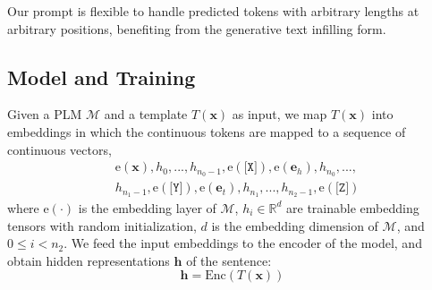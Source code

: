 \documentclass[11pt]{article}
\begin{document}
Our prompt is flexible to handle predicted tokens with arbitrary lengths at arbitrary positions, benefiting from the generative text infilling form.
\begin{comment}
For example, we convert the example given in Section~\ref{4.1} to :

\begin{small}
	\begin{equation*}
		\begin{aligned}
			T(\boldsymbol{x})=&	\boldsymbol{x}\; [v_0]... [v_{n_0-1}] \texttt{[X]} \textit{Washington}\, \textit{National}\,\textit{Opera} \\&[v_{n_0}]... [v_{n_1-1}] \texttt{[Y]} \textit{Christina} [v_{n_1}]... [v_{n_2-1}] \texttt{[Z]}
		\end{aligned}
	\end{equation*}
\end{small}

The target sequence will be $\boldsymbol{y}=$ ``\texttt{[X]}, \textit{organization}, \texttt{[Y]}, \textit{person}, \texttt{[Z]}, \textit{top}, \textit{members}, \textit{or}, \textit{employees}, \texttt{[W]}''.
\end{comment}

\subsection{Model and Training}\label{4.3}


Given a PLM $\mathcal{M}$ and a template $T(\boldsymbol{x})$ as input, we map $T(\boldsymbol{x})$ into embeddings in which the continuous tokens are mapped to a sequence of continuous vectors,
\begin{equation*}
\begin{aligned}
	&\mathrm{e}(\boldsymbol{x}), h_0, ..., h_{n_0-1}, \mathrm{e}(\texttt{[X]}), \mathrm{e}(\boldsymbol{e}_h), h_{n_0}, ...,\\& h_{n_1-1}, \mathrm{e}(\texttt{[Y]}), \mathrm{e}(\boldsymbol{e}_t), h_{n_1}, ..., h_{n_2-1}, \mathrm{e}(\texttt{[Z]})
\end{aligned}
\end{equation*}
where $\mathrm{e}(\cdot)$ is the embedding layer of $\mathcal{M}$, $h_i\in \mathbb{R}^d$ are trainable embedding tensors with random initialization, $d$ is the embedding dimension of $\mathcal{M}$, and $0 \leq i < n_2$. We feed the input embeddings to the encoder of the model, and obtain hidden representations $\mathbf{h}$ of the sentence:
\begin{equation*}
\mathbf{h} = \textrm{Enc}(T(\boldsymbol{x}))
\end{equation*}
\end{document}
